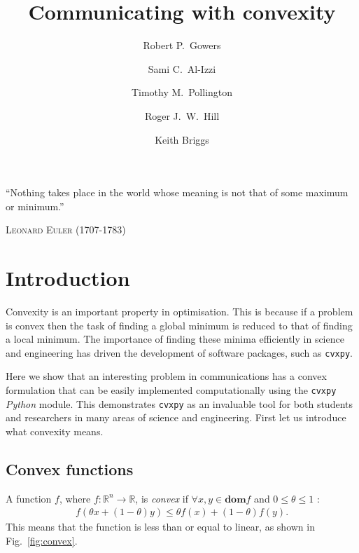 \documentclass[twocolumn,secnumarabic,amssymb, nobibnotes, aps, prl,superscriptaddress]{revtex4-1}
\newcommand{\NewsItem}[1]{%
		\large #1 \vspace{4pt}
		\par \normalsize \normalfont}
\newcommand{\NewsAuthor}[1]{%
			\hfill \textsc{#1} \vspace{4pt}
			\par \normalfont}
\begin{document}

\title{Communicating with convexity}
\author{Robert P.~Gowers}%
\author{Sami C.~Al-Izzi}%
\author{Timothy M.~Pollington}%
\author{Roger J.~W.~Hill}%
\author{Keith Briggs}
\maketitle


	\NewsItem{\noindent``Nothing takes place in the world whose meaning is not that of some maximum or minimum.''}
	\NewsAuthor{Leonard Euler (1707-1783)}
    
\section{Introduction}
\noindent Convexity is an important property in optimisation. This is because if a problem is convex then the task of finding a global minimum is reduced to that of finding a local minimum. The importance of finding these minima efficiently in science and engineering has driven the development of software packages, such as \texttt{cvxpy}.

Here we show that an interesting problem in communications has a convex formulation that can be easily implemented computationally using the \texttt{cvxpy} \textit{Python} module. This demonstrates \texttt{cvxpy} as an invaluable tool for both students and researchers in many areas of science and engineering. First let us introduce what convexity means.

\subsection{Convex functions}

\noindent A function $f$, where $f:\mathbb{R}^n \rightarrow \mathbb{R}$, is \textit{convex} if $\forall x,y\in \textbf{dom} f$ and $0 \leq \theta \leq 1$ \cite[p.67]{cvxpybook}:
\begin{align}
f(\theta x + (1-\theta)y) \leq \theta f(x)+(1-\theta)f(y).
\end{align}
This means that the function is less than or equal to linear, as shown in Fig.~\ref{fig:convex}. %
\end{document}
